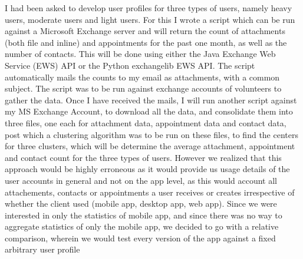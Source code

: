 I had been asked to develop user profiles for three types of users, namely heavy users, moderate users and light users. For this I wrote a script which can be run against a Microsoft Exchange server and will return the count of attachments (both file and inline) and appointments for the past one month, as well as the number of contacts. This will be done using either the Java Exchange Web Service (EWS) API or the Python exchangelib EWS API. The script automatically mails the counts to my email as attachments, with a common subject. The script was to be run against exchange accounts of volunteers to gather the data. Once I have received the mails, I will run another script against my MS Exchange Account, to download all the data, and consolidate them into three files, one each for attachment data, appointment data and contact data, post which a clustering algorithm was to be run on these files, to find the centers for three clusters, which will be determine the average attachment, appointment and contact count for the three types of users. However we realized that this approach would be highly erroneous as it would provide us usage details of the user accounts in general and not on the app level, as this would account all attachements, contacts or appointments a user receives or creates irrespective of whether the client used (mobile app, desktop app, web app). Since we were interested in only the statistics of mobile app, and since there was no way to aggregate statistics of only the mobile app, we decided to go with a relative comparison, wherein we would test every version of the app against a fixed arbitrary user profile\\

